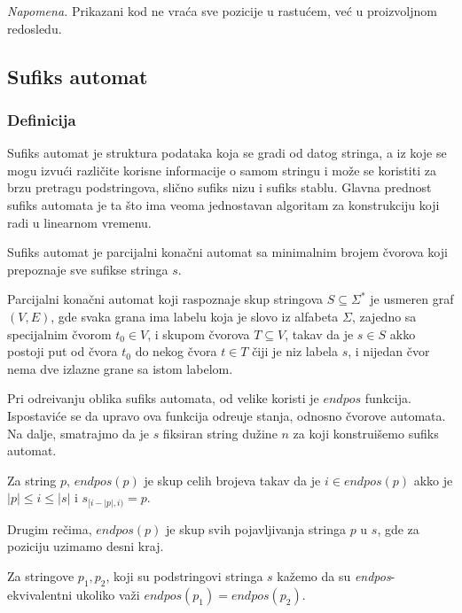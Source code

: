 \textit{Napomena.} Prikazani kod ne vra\' ca sve pozicije u rastu\' cem, ve\' c u proizvoljnom redosledu.

\subsection{Sufiks automat}

\subsubsection{Definicija}

Sufiks automat je struktura podataka koja se gradi od datog stringa, a iz koje se mogu izvu\' ci razli\v cite korisne informacije o samom stringu i mo\v ze se koristiti za brzu pretragu podstringova, sli\v cno sufiks nizu i sufiks stablu. Glavna prednost sufiks automata je ta \v sto ima veoma jednostavan algoritam za konstrukciju koji radi u linearnom vremenu.

\begin{dfn}
Sufiks automat je parcijalni kona\v cni automat sa minimalnim brojem \v cvorova koji prepoznaje sve sufikse stringa $s$.
\end{dfn}

Parcijalni kona\v cni automat koji raspoznaje skup stringova $S \subseteq \Sigma^*$ je usmeren graf $(V,E)$, gde svaka grana ima labelu koja je slovo iz alfabeta $\Sigma$, zajedno sa specijalnim \v cvorom $t_0 \in V$, i skupom \v cvorova $T \subseteq V$, takav da je $s \in S$ akko postoji put od \v cvora $t_0$ do nekog \v cvora $t \in T$ \v ciji je niz labela $s$, i nijedan \v cvor nema dve izlazne grane sa istom labelom.

Pri odre\dj ivanju oblika sufiks automata, od velike koristi je $endpos$ funkcija. Ispostavi\' ce se da upravo ova funkcija odre\dj uje stanja, odnosno \v cvorove automata. Na dalje, smatrajmo da je $s$ fiksiran string du\v zine $n$ za koji konstrui\v semo sufiks automat.

\begin{dfn}
Za string $p$, $endpos(p)$ je skup celih brojeva takav da je $i \in endpos(p)$ akko je $|p| \leq i \leq |s|$ i $s_{[i-|p|,i)} = p$.
\end{dfn}

Drugim re\v cima, $endpos(p)$ je skup svih pojavljivanja stringa $p$ u $s$, gde za poziciju uzimamo desni kraj.

\begin{dfn}
Za stringove $p_1,p_2$, koji su podstringovi stringa $s$ ka\v zemo da su \textit{endpos}-ekvivalentni ukoliko va\v zi $endpos(p_1) = endpos(p_2)$.
\end{dfn}

